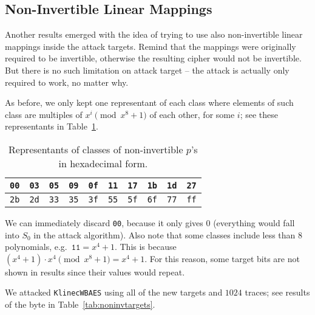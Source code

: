 
\subsection{Non-Invertible Linear Mappings}
\label{sec:noninv}

Another results emerged with the idea of trying to use also non-invertible linear mappings inside the attack targets. Remind that the mappings were originally required to be invertible, otherwise the resulting cipher would not be invertible. But there is no such limitation on attack target -- the attack is actually only required to work, no matter why.

As before, we only kept one representant of each class where elements of such class are multiples of $x^i\pmod{x^8+1}$ of each other, for some $i$; see these representants in Table~\ref{tab:classreprenoninv}.

\begin{table}[h]
	\begin{center}
	\begin{tabular}{| c | c | c | c | c | c | c | c | c | c |}
		\hline
		{\tt 00} & {\tt 03} & {\tt 05} & {\tt 09} & {\tt 0f} & {\tt 11} & {\tt 17} & {\tt 1b} & {\tt 1d} & {\tt 27} \\
		\hline
		{\tt 2b} & {\tt 2d} & {\tt 33} & {\tt 35} & {\tt 3f} & {\tt 55} & {\tt 5f} & {\tt 6f} & {\tt 77} & {\tt ff} \\
		\hline
	\end{tabular}
	\end{center}
\caption{Representants of classes of non-invertible $p$'s in hexadecimal form.}
\label{tab:classreprenoninv}
\end{table}

We can immediately discard {\tt 00}, because it only gives $0$ (everything would fall into $S_0$ in the attack algorithm). Also note that some classes include less than $8$ polynomials, e.g.\ $\texttt{11} = x^4+1$. This is because $(x^4+1)\cdot x^4 \pmod{x^8+1} = x^4+1$. For this reason, some target bits are not shown in results since their values would repeat.

We attacked {\tt KlinecWBAES} using all of the new targets and $1024$ traces; see results of the  byte in Table~\ref{tab:noninvtargets}.

